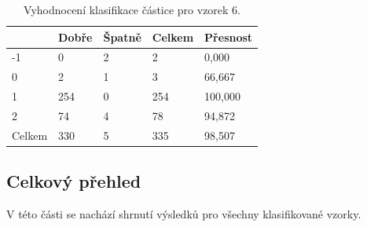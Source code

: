 \documentclass[11pt,twoside,a4paper,table]{book}
\begin{document}
\begin{table}[h]
\begin{center}
\begin{tabular}{lllll}
\rowcolor[HTML]{9B9B9B} 
\multicolumn{1}{|l|}{\cellcolor[HTML]{9B9B9B}Třída} & \multicolumn{1}{l|}{\cellcolor[HTML]{9B9B9B}Dobře} & \multicolumn{1}{l|}{\cellcolor[HTML]{9B9B9B}Špatně}  & \multicolumn{1}{l|}{\cellcolor[HTML]{9B9B9B}Celkem} & \multicolumn{1}{l|}{\cellcolor[HTML]{9B9B9B}Přesnost} \\ \hline
\multicolumn{1}{|l|}{-1}                            & \multicolumn{1}{l|}{0}                             & \multicolumn{1}{l|}{2}                               & \multicolumn{1}{l|}{2}                              & \multicolumn{1}{l|}{0,000}                            \\ \hline
\multicolumn{1}{|l|}{0}                             & \multicolumn{1}{l|}{2}                             & \multicolumn{1}{l|}{1}                               & \multicolumn{1}{l|}{3}                              & \multicolumn{1}{l|}{66,667}                           \\ \hline
\multicolumn{1}{|l|}{1}                             & \multicolumn{1}{l|}{254}                           & \multicolumn{1}{l|}{0}                               & \multicolumn{1}{l|}{254}                            & \multicolumn{1}{l|}{100,000}                          \\ \hline
\multicolumn{1}{|l|}{2}                             & \multicolumn{1}{l|}{74}                            & \multicolumn{1}{l|}{4}                               & \multicolumn{1}{l|}{78}                             & \multicolumn{1}{l|}{94,872}                           \\ \hline
\multicolumn{1}{|l|}{Celkem}                        & \multicolumn{1}{l|}{330}                           & \multicolumn{1}{l|}{5}                               & \multicolumn{1}{l|}{335}                            & \multicolumn{1}{l|}{98,507}                           \\ \hline
\end{tabular}
\end{center}
\caption{Vyhodnocení klasifikace částice pro vzorek 6.}
\label{tab:classresult7}
\end{table}

\FloatBarrier
\subsection{Celkový přehled}
V této části se nachází shrnutí výsledků pro všechny klasifikované vzorky.
\end{document}
